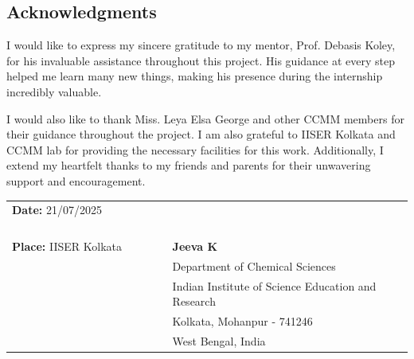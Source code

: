 \begin{center}
    \section*{Acknowledgments}
\end{center}

\vspace{1cm}

\justify
I would like to express my sincere gratitude to my mentor, Prof. Debasis Koley, for his invaluable assistance throughout this project. His guidance at every step helped me learn many new things, making his presence during the internship incredibly valuable.

\vspace{1cm}

I would also like to thank Miss. Leya Elsa George and other CCMM members for their guidance throughout the project. I am also grateful to IISER Kolkata and CCMM lab for providing the necessary facilities for this work. Additionally, I extend my heartfelt thanks to my friends and parents for their unwavering support and encouragement.

\vspace{3cm}

\noindent
\begin{tabular}{@{}p{0.4\linewidth}@{}p{0.6\linewidth}@{}}
\textbf{Date:} 21/07/2025   \\[1.5ex]
\\
\\
\dotfill \\ &   \\[1.5ex]
\textbf{Place:} IISER Kolkata &  \hspace{3cm}\textbf{Jeeva K}\\[1.5ex]
& \hspace{1cm}Department of Chemical Sciences \\[1.55ex]
& Indian Institute of Science Education and Research  \\[1.5ex]
& \hspace{1cm} Kolkata, Mohanpur - 741246  \\[1.5ex]
& \hspace{2cm} West Bengal, India \\[1.5ex]
\end{tabular}

\vspace{2cm}

\noindent\dotfill


